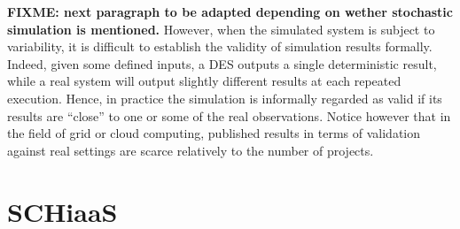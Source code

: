 \textbf{FIXME: next paragraph to be adapted depending on wether stochastic
  simulation is mentioned.}
However, when the simulated system is subject to variability, it is difficult to
establish  the  validity of  simulation  results  formally. Indeed,  given  some
defined inputs, a DES outputs a single deterministic result, while a real system
will output  slightly different results  at each repeated execution.   Hence, in
practice  the simulation  is informally  regarded as  valid if  its results  are
``close'' to one or  some of the real observations.  Notice  however that in the
field  of grid  or cloud  computing, published  results in  terms of  validation
against real settings are scarce relatively to the number of projects.



\section{SCHiaaS}

